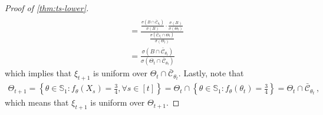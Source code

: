 \documentclass[letter, 12pt]{report}
\newcommand{\cC}{\mathcal C}
\newcommand{\bS}{\mathbb S}
\newcommand{\1}{\mathbf{1}}
\theoremstyle{plain}
\theoremstyle{definition}
\theoremstyle{remark}
\begin{document}
\begin{proof}[Proof of \cref{thm:ts-lower}]
\begin{align*}
{        }
        \\
         & =
        \frac{
            \frac{
                \sigma(B \cap \bar{\cC}_{\theta_t})
            }{
                \sigma(B)
            }
            \cdot
            \frac{
                \sigma(B)
            }{
                \sigma(\Theta_t)
            }
        }{
            \frac{
                \sigma(\bar{\cC}_{\theta_t} \cap \Theta_t)
            }{
                \sigma(\Theta_t)
            }
        }
        \\
         & =
        \frac{
            \sigma(B \cap \bar{\cC}_{\theta_t})
        }{
            \sigma(\Theta_t \cap \bar{\cC}_{\theta_t})
        }
    \end{align*}
    which implies that $\xi_{t+1}$ is uniform over
    $\Theta_{t} \cap \bar{\cC}_{\theta_t}$.
    Lastly, note that
    \begin{align*}
        \Theta_{t+1}
        =
        \left\{
        \theta \in \bS_1:
        f_\theta(X_s) = \frac34
        ,
        \forall s \in [t]
        \right\}
        =
        \Theta_t
        \cap
        \left\{
        \theta \in \bS_1:
        f_\theta(\theta_t) = \frac34
        \right\}
        =
        \Theta_t \cap \bar{\cC}_{\theta_t}\,,
    \end{align*}
    which means that $\xi_{t+1}$ is uniform over $\Theta_{t+1}$.


\end{proof}
\end{document}
